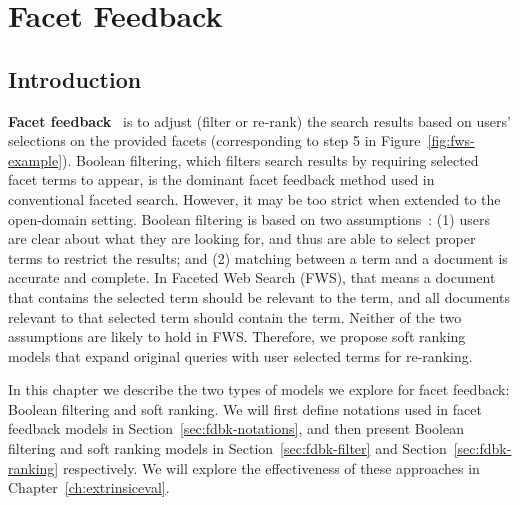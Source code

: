 \chapter{Facet Feedback}
\label{ch:feedback}
\section{Introduction}
\label{sec:fdbk-intro}
\textbf{Facet feedback}~\cite{kong2014extending} is to adjust (filter or re-rank) the search results based on users' selections on the provided facets (corresponding to step 5 in Figure~\ref{fig:fws-example}). Boolean filtering, which filters search results by requiring selected facet terms to appear, is the dominant facet feedback method used in conventional faceted search. However, it may be too strict when extended to the open-domain setting. Boolean filtering is based on two assumptions~\cite{zhang2010interactive}: (1) users are clear about what they are looking for, and thus are able to select proper terms to restrict the results; and (2) matching between a term and a document is accurate and complete. In Faceted Web Search (FWS), that means a document that contains the selected term should be relevant to the term, and all documents relevant to that selected term should contain the term. Neither of the two assumptions are likely to hold in FWS.
Therefore, we propose soft ranking models that expand original queries with user selected terms for re-ranking.

In this chapter we describe the two types of models we explore for facet feedback: Boolean filtering and soft ranking. We will first define notations used in facet feedback models in Section~\ref{sec:fdbk-notations}, and then present Boolean filtering and soft ranking models in Section~\ref{sec:fdbk-filter} and Section~\ref{sec:fdbk-ranking} respectively.  We will explore the effectiveness of these approaches in Chapter~\ref{ch:extrinsiceval}. 

